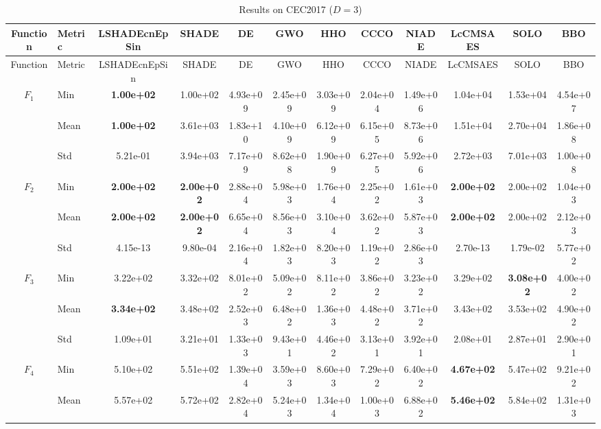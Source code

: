 \begin{center}
\small
\renewcommand{\arraystretch}{1.25}
\begin{longtable}{clcccccccccc}
\caption{Results on CEC2017 ($D=3$) }
\label{tab:results_CEC2017_3} \\
\toprule
Function & Metric & LSHADEcnEpSin & SHADE & DE & GWO & HHO & CCCO & NIADE & LcCMSAES & SOLO & BBO \\
\midrule
\endfirsthead
\toprule
Function & Metric & LSHADEcnEpSin & SHADE & DE & GWO & HHO & CCCO & NIADE & LcCMSAES & SOLO & BBO \\
\midrule
\endhead
\multirow{3}{*}{$F_{1}$} & Min & \textbf{1.00e+02} & 1.00e+02 & 4.93e+09 & 2.45e+09 & 3.03e+09 & 2.04e+04 & 1.49e+06 & 1.04e+04 & 1.53e+04 & 4.54e+07 \\
 & Mean & \textbf{1.00e+02} & 3.61e+03 & 1.83e+10 & 4.10e+09 & 6.12e+09 & 6.15e+05 & 8.73e+06 & 1.51e+04 & 2.70e+04 & 1.86e+08 \\
 & Std & 5.21e-01 & 3.94e+03 & 7.17e+09 & 8.62e+08 & 1.90e+09 & 6.27e+05 & 5.92e+06 & 2.72e+03 & 7.01e+03 & 1.00e+08 \\
\midrule
\multirow{3}{*}{$F_{2}$} & Min & \textbf{2.00e+02} & \textbf{2.00e+02} & 2.88e+04 & 5.98e+03 & 1.76e+04 & 2.25e+02 & 1.61e+03 & \textbf{2.00e+02} & 2.00e+02 & 1.04e+03 \\
 & Mean & \textbf{2.00e+02} & \textbf{2.00e+02} & 6.65e+04 & 8.56e+03 & 3.10e+04 & 3.62e+02 & 5.87e+03 & \textbf{2.00e+02} & 2.00e+02 & 2.12e+03 \\
 & Std & 4.15e-13 & 9.80e-04 & 2.16e+04 & 1.82e+03 & 8.20e+03 & 1.19e+02 & 2.86e+03 & 2.70e-13 & 1.79e-02 & 5.77e+02 \\
\midrule
\multirow{3}{*}{$F_{3}$} & Min & 3.22e+02 & 3.32e+02 & 8.01e+02 & 5.09e+02 & 8.11e+02 & 3.86e+02 & 3.23e+02 & 3.29e+02 & \textbf{3.08e+02} & 4.00e+02 \\
 & Mean & \textbf{3.34e+02} & 3.48e+02 & 2.52e+03 & 6.48e+02 & 1.36e+03 & 4.48e+02 & 3.71e+02 & 3.43e+02 & 3.53e+02 & 4.90e+02 \\
 & Std & 1.09e+01 & 3.21e+01 & 1.33e+03 & 9.43e+01 & 4.46e+02 & 3.13e+01 & 3.92e+01 & 2.08e+01 & 2.87e+01 & 2.90e+01 \\
\midrule
\multirow{3}{*}{$F_{4}$} & Min & 5.10e+02 & 5.51e+02 & 1.39e+04 & 3.59e+03 & 8.60e+03 & 7.29e+02 & 6.40e+02 & \textbf{4.67e+02} & 5.47e+02 & 9.21e+02 \\
 & Mean & 5.57e+02 & 5.72e+02 & 2.82e+04 & 5.24e+03 & 1.34e+04 & 1.00e+03 & 6.88e+02 & \textbf{5.46e+02} & 5.84e+02 & 1.31e+03 \\

\end{longtable}
\end{center}
